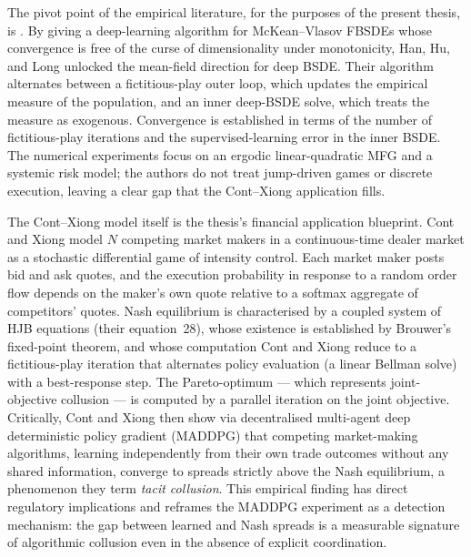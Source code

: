 The pivot point of the empirical literature, for the purposes of the
present thesis, is \citet{han2022}.  By giving a deep-learning
algorithm for McKean--Vlasov FBSDEs whose convergence is free of the
curse of dimensionality under monotonicity, Han, Hu, and Long
unlocked the mean-field direction for deep BSDE.  Their algorithm
alternates between a fictitious-play outer loop, which updates the
empirical measure of the population, and an inner deep-BSDE solve,
which treats the measure as exogenous.  Convergence is established
in terms of the number of fictitious-play iterations and the
supervised-learning error in the inner BSDE.  The numerical
experiments focus on an ergodic linear-quadratic MFG and a systemic
risk model; the authors do not treat jump-driven games or discrete
execution, leaving a clear gap that the Cont--Xiong application
fills.

The Cont--Xiong model itself \citep{cont2024} is the thesis's
financial application blueprint.  Cont and Xiong model $N$ competing
market makers in a continuous-time dealer market as a stochastic
differential game of intensity control.  Each market maker posts bid
and ask quotes, and the execution probability in response to a
random order flow depends on the maker's own quote relative to a
softmax aggregate of competitors' quotes.  Nash equilibrium is
characterised by a coupled system of HJB equations (their
equation~28), whose existence is established by Brouwer's fixed-point
theorem, and whose computation Cont and Xiong reduce to a
fictitious-play iteration that alternates policy evaluation (a
linear Bellman solve) with a best-response step.  The Pareto-optimum
— which represents joint-objective collusion — is computed by a
parallel iteration on the joint objective.  Critically, Cont and
Xiong then show via decentralised multi-agent deep deterministic
policy gradient (MADDPG) that competing market-making algorithms,
learning independently from their own trade outcomes without any
shared information, converge to spreads strictly above the Nash
equilibrium, a phenomenon they term \emph{tacit collusion}.  This
empirical finding has direct regulatory implications and
reframes the MADDPG experiment as a detection mechanism: the gap
between learned and Nash spreads is a measurable signature of
algorithmic collusion even in the absence of explicit coordination.


